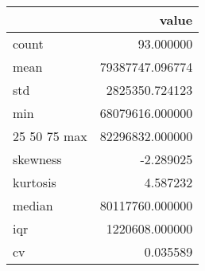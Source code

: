 \begin{tabular}{lr}
\toprule
 & value \\
\midrule
count & 93.000000 \\
mean & 79387747.096774 \\
std & 2825350.724123 \\
min & 68079616.000000 \\
25%
50%
75%
max & 82296832.000000 \\
skewness & -2.289025 \\
kurtosis & 4.587232 \\
median & 80117760.000000 \\
iqr & 1220608.000000 \\
cv & 0.035589 \\
\bottomrule
\end{tabular}
